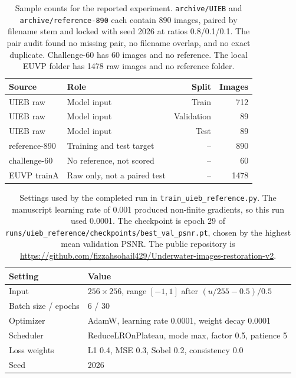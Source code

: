 
\begin{table}[ht]
\caption{Sample counts for the reported experiment. \texttt{archive/UIEB} and \texttt{archive/reference-890} each contain 890 images, paired by filename stem and locked with seed 2026 at ratios 0.8/0.1/0.1. The pair audit found no missing pair, no filename overlap, and no exact duplicate. Challenge-60 has 60 images and no reference. The local EUVP folder has 1478 raw images and no reference folder.}
\begin{tabular}{llrr}
\hline
Source & Role & Split & Images \\
\hline
UIEB raw & Model input & Train & 712 \\
UIEB raw & Model input & Validation & 89 \\
UIEB raw & Model input & Test & 89 \\
reference-890 & Training and test target & -- & 890 \\
challenge-60 & No reference, not scored & -- & 60 \\
EUVP trainA & Raw only, not a paired test & -- & 1478 \\
\hline
\end{tabular}
\end{table}

\begin{table}[ht]
\caption{Settings used by the completed run in \texttt{train\_uieb\_reference.py}. The manuscript learning rate of 0.001 produced non-finite gradients, so this run used 0.0001. The checkpoint is epoch 29 of \texttt{runs/uieb\_reference/checkpoints/best\_val\_psnr.pt}, chosen by the highest mean validation PSNR. The public repository is \url{https://github.com/fizzahsohail429/Underwater-images-restoration-v2}.}
\begin{tabular}{ll}
\hline
Setting & Value \\
\hline
Input & $256\times256$, range $[-1,1]$ after $(u/255-0.5)/0.5$ \\
Batch size / epochs & 6 / 30 \\
Optimizer & AdamW, learning rate 0.0001, weight decay 0.0001 \\
Scheduler & ReduceLROnPlateau, mode max, factor 0.5, patience 5 \\
Loss weights & L1 0.4, MSE 0.3, Sobel 0.2, consistency 0.0 \\
Seed & 2026 \\
\hline
\end{tabular}
\end{table}

